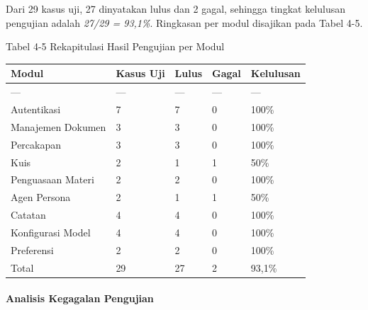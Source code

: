\documentclass[12pt,a4paper]{article}
\begin{document}
Dari 29 kasus uji, 27 dinyatakan lulus dan 2 gagal, sehingga tingkat kelulusan pengujian adalah \textit{27/29 = 93,1\%}. Ringkasan per modul disajikan pada Tabel 4-5.



Tabel 4-5	Rekapitulasi Hasil Pengujian per Modul



\begin{table}[h]

\centering

\begin{tabular}{lllll}

\toprule

Modul & Kasus Uji & Lulus & Gagal & Kelulusan \\

\midrule

--- & --- & --- & --- & --- \\

Autentikasi & 7 & 7 & 0 & 100\% \\

Manajemen Dokumen & 3 & 3 & 0 & 100\% \\

Percakapan & 3 & 3 & 0 & 100\% \\

Kuis & 2 & 1 & 1 & 50\% \\

Penguasaan Materi & 2 & 2 & 0 & 100\% \\

Agen Persona & 2 & 1 & 1 & 50\% \\

Catatan & 4 & 4 & 0 & 100\% \\

Konfigurasi Model & 4 & 4 & 0 & 100\% \\

Preferensi & 2 & 2 & 0 & 100\% \\

Total & 29 & 27 & 2 & 93,1\% \\

\bottomrule

\end{tabular}

\end{table}

\paragraph*{Analisis Kegagalan Pengujian}
\end{document}
